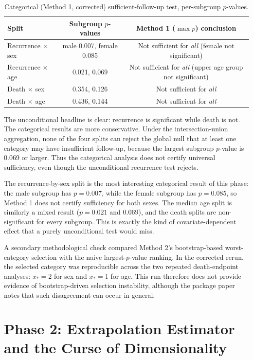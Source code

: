 \documentclass[11pt]{article}
\begin{document}
\begin{table}[h]
\centering
\caption{Categorical (Method 1, corrected) sufficient-follow-up test, per-subgroup $p$-values.}
\begin{tabular}{lcc}
\toprule
Split & Subgroup $p$-values & Method 1 ($\max p$) conclusion \\
\midrule
Recurrence $\times$ sex & male 0.007, female 0.085 & Not sufficient for \emph{all} (female not significant) \\
Recurrence $\times$ age & 0.021, 0.069 & Not sufficient for \emph{all} (upper age group not significant) \\
Death $\times$ sex & 0.354, 0.126 & Not sufficient for \emph{all} \\
Death $\times$ age & 0.436, 0.144 & Not sufficient for \emph{all} \\
\bottomrule
\end{tabular}
\end{table}

The unconditional headline is clear: recurrence is significant while death is not.
The categorical results are more conservative. Under the intersection-union
aggregation, none of the four splits can reject the global null that at least one
category may have insufficient follow-up, because the largest subgroup $p$-value is
0.069 or larger. Thus the categorical analysis does not certify universal sufficiency,
even though the unconditional recurrence test rejects.

The recurrence-by-sex split is the most interesting categorical result of this phase:
the male subgroup has $p=0.007$, while the female subgroup has $p=0.085$, so Method 1
does not certify sufficiency for both sexes. The median age split is similarly
a mixed result ($p=0.021$ and $0.069$), and the death splits are non-significant
for every subgroup. This is exactly the kind of covariate-dependent effect that a purely
unconditional test would miss.

A secondary methodological check compared Method 2's bootstrap-based worst-category
selection with the naive largest-$p$-value ranking. In the corrected rerun, the
selected category was reproducible across the two repeated death-endpoint analyses:
$x_{\ast}=2$ for sex and $x_{\ast}=1$ for age. This run therefore does not provide
evidence of bootstrap-driven selection instability, although the package paper notes
that such disagreement can occur in general.


\section{Phase 2: Extrapolation Estimator and the Curse of Dimensionality}
\end{document}
